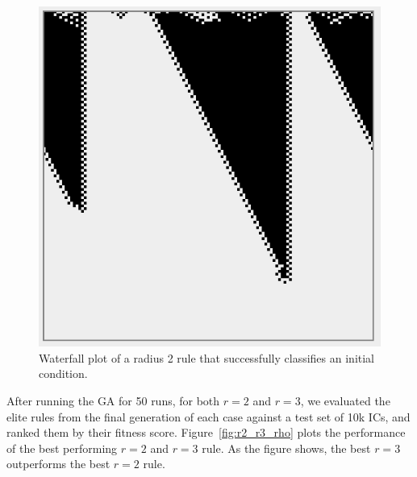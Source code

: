 \begin{figure}
\begin{center}
\includegraphics[width=0.8\linewidth]{figures/converging_radius2.png}
\caption{Waterfall plot of a radius 2 rule that successfully classifies an initial condition.}
\label{fig:waterfall_2}
\end{center}
\end{figure}

After running the GA for 50 runs, for both $r = 2$ and $r = 3$, we evaluated the elite rules from the final generation of each case against a test set of 10k ICs, and ranked them by their fitness score. Figure~\ref{fig:r2_r3_rho} plots the performance of the best performing $r = 2$ and $r = 3$ rule. As the figure shows, 
the best $r = 3$ outperforms the best $r = 2$ rule.

